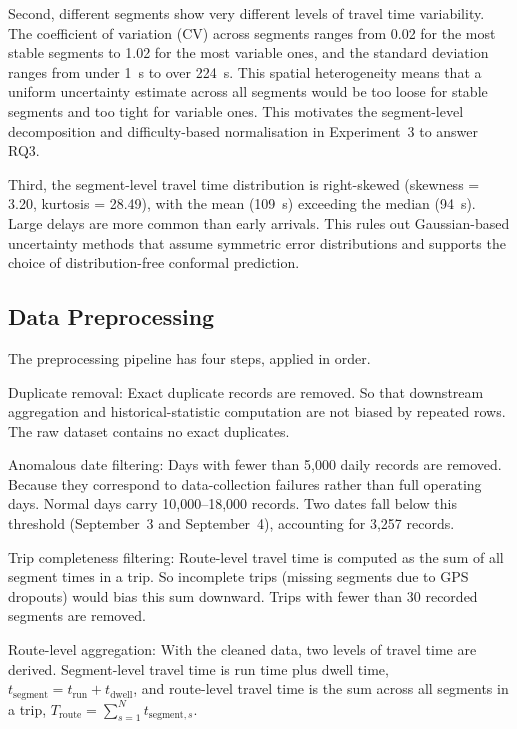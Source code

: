 \documentclass[12pt, a4paper, oneside]{report}
\begin{document}
Second, different segments show very different levels of travel time variability. The coefficient of variation (CV) across segments ranges from 0.02 for the most stable segments to 1.02 for the most variable ones, and the standard deviation ranges from under 1~s to over 224~s. This spatial heterogeneity means that a uniform uncertainty estimate across all segments would be too loose for stable segments and too tight for variable ones. This motivates the segment-level decomposition and difficulty-based normalisation in Experiment~3 to answer RQ3.

Third, the segment-level travel time distribution is right-skewed (skewness = 3.20, kurtosis = 28.49), with the mean (109~s) exceeding the median (94~s). Large delays are more common than early arrivals. This rules out Gaussian-based uncertainty methods that assume symmetric error distributions and supports the choice of distribution-free conformal prediction.

\subsection{Data Preprocessing}
\label{subsec:preprocessing}

The preprocessing pipeline has four steps, applied in order.

Duplicate removal: Exact duplicate records are removed. So that downstream aggregation and historical-statistic computation are not biased by repeated rows. The raw dataset contains no exact duplicates.

Anomalous date filtering: Days with fewer than 5,000 daily records are removed. Because they correspond to data-collection failures rather than full operating days. Normal days carry 10,000--18,000 records. Two dates fall below this threshold (September~3 and September~4), accounting for 3,257 records.

Trip completeness filtering: Route-level travel time is computed as the sum of all segment times in a trip. So incomplete trips (missing segments due to GPS dropouts) would bias this sum downward. Trips with fewer than 30 recorded segments are removed.

Route-level aggregation: With the cleaned data, two levels of travel time are derived. Segment-level travel time is run time plus dwell time, $t_{\text{segment}} = t_{\text{run}} + t_{\text{dwell}}$, and route-level travel time is the sum across all segments in a trip, $T_{\text{route}} = \sum_{s=1}^{N} t_{\text{segment}, s}$.
\end{document}
